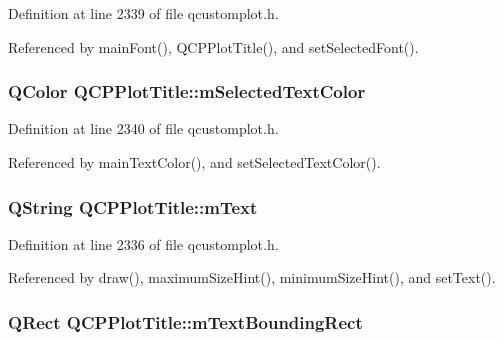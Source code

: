 Definition at line 2339 of file qcustomplot.\+h.



Referenced by main\+Font(), Q\+C\+P\+Plot\+Title(), and set\+Selected\+Font().

\hypertarget{class_q_c_p_plot_title_a8b9760e62af92814c4effdd7ad69c5f9}{}
\subsubsection[{m\+Selected\+Text\+Color}]{\setlength{\rightskip}{0pt plus 5cm}Q\+Color Q\+C\+P\+Plot\+Title\+::m\+Selected\+Text\+Color\hspace{0.3cm}{\ttfamily [protected]}}\label{class_q_c_p_plot_title_a8b9760e62af92814c4effdd7ad69c5f9}


Definition at line 2340 of file qcustomplot.\+h.



Referenced by main\+Text\+Color(), and set\+Selected\+Text\+Color().

\hypertarget{class_q_c_p_plot_title_a0d961bfac1211d59d3b0bc30d35f6379}{}
\subsubsection[{m\+Text}]{\setlength{\rightskip}{0pt plus 5cm}Q\+String Q\+C\+P\+Plot\+Title\+::m\+Text\hspace{0.3cm}{\ttfamily [protected]}}\label{class_q_c_p_plot_title_a0d961bfac1211d59d3b0bc30d35f6379}


Definition at line 2336 of file qcustomplot.\+h.



Referenced by draw(), maximum\+Size\+Hint(), minimum\+Size\+Hint(), and set\+Text().

\hypertarget{class_q_c_p_plot_title_a7178a0f6c1e633c144c17b4de4e0b840}{}
\subsubsection[{m\+Text\+Bounding\+Rect}]{\setlength{\rightskip}{0pt plus 5cm}Q\+Rect Q\+C\+P\+Plot\+Title\+::m\+Text\+Bounding\+Rect\hspace{0.3cm}{\ttfamily [protected]}}\label{class_q_c_p_plot_title_a7178a0f6c1e633c144c17b4de4e0b840}


